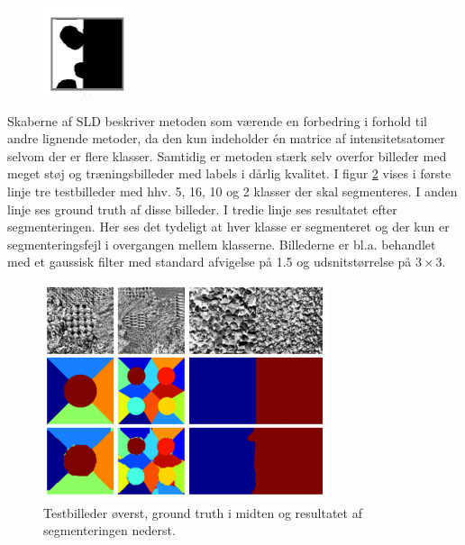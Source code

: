 \begin{figure}[H]
		\centering
		\includegraphics[scale=1]{files/postmethod/img/dict_5.png}
	\caption{\label{fig:postmethod_sld_resulting}}
\end{figure}

Skaberne af SLD beskriver metoden som værende en forbedring i forhold til andre lignende metoder, da den kun indeholder én matrice af intensitetsatomer selvom der er flere klasser. Samtidig er metoden stærk selv overfor billeder med meget støj og træningsbilleder med labels i dårlig kvalitet. I figur \ref{fig:postmethod_sld_testing} vises i første linje tre testbilleder med hhv. 5, 16, 10 og 2 klasser der skal segmenteres. I anden linje ses ground truth af disse billeder. I tredie linje ses resultatet efter segmenteringen. Her ses det tydeligt at hver klasse er segmenteret og der kun er segmenteringsfejl i overgangen mellem klasserne. Billederne er bl.a. behandlet med et gaussisk filter med standard afvigelse på 1.5 og udsnitstørrelse på $3\times3$.

\begin{figure}[H]
		\centering
		\includegraphics[scale=1]{files/postmethod/img/dict_6.png}
	\caption{Testbilleder øverst, ground truth i midten og resultatet af segmenteringen nederst.\label{fig:postmethod_sld_testing}}
\end{figure}

